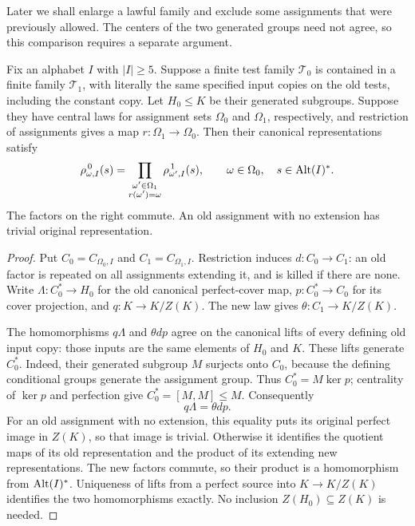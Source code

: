 Later we shall enlarge a lawful family and exclude some assignments
that were previously allowed. The centers of the two generated groups
need not agree, so this comparison requires a separate argument.

\begin{lemma}\label{lem:law-enlargement}
Fix an alphabet $I$ with $|I|\ge5$. Suppose a finite test family
$\mathcal T_0$ is contained in a finite family $\mathcal T_1$, with
literally the same specified input copies on the old tests, including
the constant copy. Let $H_0\le K$ be their generated subgroups.
Suppose they have central laws for assignment sets $\Omega_0$ and
$\Omega_1$, respectively, and restriction of assignments gives a map
$r:\Omega_1\to\Omega_0$. Then their canonical representations satisfy
\[
 \rho^{\,0}_{\omega,I}(s)
 =\prod_{\substack{\omega'\in\Omega_1\\r(\omega')=\omega}}
       \rho^{\,1}_{\omega',I}(s),
 \qquad \omega\in\Omega_0,\quad s\in\operatorname{Alt}(I)^\ast.
\]
The factors on the right commute. An old assignment with no extension
has trivial original representation.
\end{lemma}

\begin{proof}
Put $C_0=C_{\Omega_0,I}$ and $C_1=C_{\Omega_1,I}$. Restriction induces
$d:C_0\to C_1$: an old factor is repeated on all assignments extending
it, and is killed if there are none. Write
$\Lambda:C_0^\ast\to H_0$ for the old canonical perfect-cover map,
$p:C_0^\ast\to C_0$ for its cover projection, and $q:K\to K/Z(K)$.
The new law gives $\theta:C_1\to K/Z(K)$.

The homomorphisms $q\Lambda$ and $\theta dp$ agree on the canonical
lifts of every defining old input copy: those inputs are the same
elements of $H_0$ and $K$. These lifts generate $C_0^\ast$. Indeed,
their generated subgroup $M$ surjects onto $C_0$, because the defining
conditional groups generate the assignment group. Thus
$C_0^\ast=M\ker p$; centrality of $\ker p$ and perfection give
$C_0^\ast=[M,M]\le M$. Consequently
\[
 q\Lambda=\theta dp.
\]
For an old assignment with no extension, this equality puts its
original perfect image in $Z(K)$, so that image is trivial. Otherwise
it identifies the quotient maps of its old representation and the
product of its extending new representations. The new factors commute,
so their product is a homomorphism from $\operatorname{Alt}(I)^\ast$. Uniqueness of
lifts from a perfect source into $K\to K/Z(K)$ identifies the two
homomorphisms exactly. No inclusion $Z(H_0)\subseteq Z(K)$ is needed.
\end{proof}

